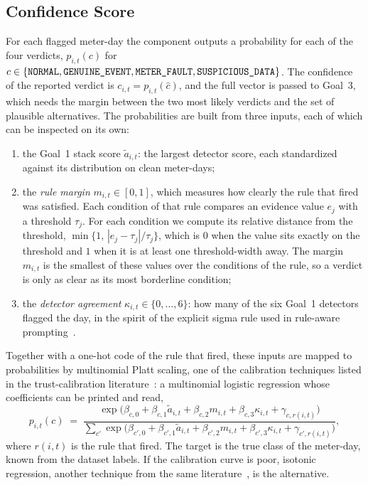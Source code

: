 \documentclass[11pt,a4paper]{article}
\begin{document}
\subsection{Confidence Score}
\label{sec:confidence}
For each flagged meter-day the component outputs a probability for each of the four verdicts,
$p_{i,t}(c)$ for $c\in\{\texttt{NORMAL},\texttt{GENUINE\_EVENT},\texttt{METER\_FAULT},\texttt{SUSPICIOUS\_DATA}\}$. The confidence of the reported verdict is
$c_{i,t}=p_{i,t}(\hat c)$, and the full vector is passed to Goal~3, which needs the margin between the two most
likely verdicts and the set of plausible alternatives. The probabilities are built from three inputs, each
of which can be inspected on its own:
\begin{enumerate}[leftmargin=*,itemsep=2pt]
  \item the Goal~1 stack score $\tilde a_{i,t}$: the largest detector score, each standardized against its
        distribution on clean meter-days;
  \item the \emph{rule margin} $m_{i,t}\in[0,1]$, which measures how clearly the rule that fired was
      satisfied. Each condition of that rule compares an evidence value $e_j$ with a threshold $\tau_j$.
      For each condition we compute its relative distance from the threshold,
      $\min\{1,\,|e_j-\tau_j|/\tau_j\}$, which is $0$ when the value sits exactly on the threshold and
      $1$ when it is at least one threshold-width away. The margin $m_{i,t}$ is the smallest of these
      values over the conditions of the rule, so a verdict is only as clear as its most borderline
      condition;
  \item the \emph{detector agreement} $\kappa_{i,t}\in\{0,\dots,6\}$: how many of the six Goal~1 detectors
        flagged the day, in the spirit of the explicit sigma rule used in rule-aware
        prompting~\cite{ruleaware}.
\end{enumerate}
Together with a one-hot code of the rule that fired, these inputs are mapped to probabilities by multinomial
Platt scaling, one of the calibration techniques listed in the trust-calibration literature~\cite{trustcal}:
a multinomial logistic regression whose coefficients can be printed and read,
\begin{equation}
  p_{i,t}(c)\;=\;\frac{\exp\bigl(\beta_{c,0}+\beta_{c,1}\tilde a_{i,t}+\beta_{c,2}m_{i,t}+\beta_{c,3}\kappa_{i,t}+\gamma_{c,r(i,t)}\bigr)}
  {\sum_{c'}\exp\bigl(\beta_{c',0}+\beta_{c',1}\tilde a_{i,t}+\beta_{c',2}m_{i,t}+\beta_{c',3}\kappa_{i,t}+\gamma_{c',r(i,t)}\bigr)},
\end{equation}
where $r(i,t)$ is the rule that fired. The target is the true class of the meter-day, known from the dataset
labels. If the calibration curve is poor, isotonic regression, another technique from the same
literature~\cite{trustcal}, is the alternative.
\end{document}
